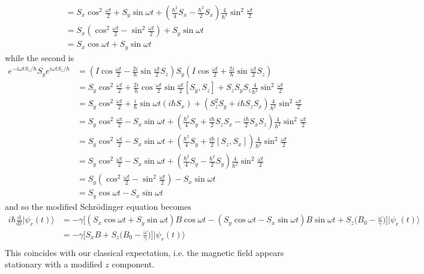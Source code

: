 \documentclass[../principles-of-quantum-mechanics.tex]{subfiles}
\begin{document}
\begin{questions}
\begin{solution}
\begin{align*}
				&= S_x\cos^2\tfrac{\omega t}{2} + S_y\sin\omega t + (\tfrac{\hbar^2}{4}S_x - \tfrac{\hbar^2}{2}S_x)\tfrac{4}{\hbar^2}\sin^2\tfrac{\omega t}{2} \\
				&= S_x(\cos^2\tfrac{\omega t}{2} - \sin^2\tfrac{\omega t}{2}) + S_y\sin\omega t \\
				&= S_x\cos\omega t + S_y\sin\omega t
			\end{align*}
			while the second is
			\begin{align*}
				e^{-i\omega tS_z/\hbar}S_ye^{i\omega tS_z/\hbar} &= (I\cos\tfrac{\omega t}{2} - \tfrac{2i}{\hbar}\sin\tfrac{\omega t}{2}S_z)S_y(I\cos\tfrac{\omega t}{2} + \tfrac{2i}{\hbar}\sin\tfrac{\omega t}{2}S_z) \\
				&= S_y\cos^2\tfrac{\omega t}{2} + \tfrac{2i}{\hbar}\cos\tfrac{\omega t}{2}\sin\tfrac{\omega t}{2}[S_y, S_z] +  S_zS_yS_z\tfrac{4}{\hbar^2}\sin^2\tfrac{\omega t}{2} \\
				&= S_y\cos^2\tfrac{\omega t}{2} + \frac{i}{\hbar}\sin\omega t(i\hbar S_x) + (S_z^2S_y + i\hbar S_zS_x)\tfrac{4}{\hbar^2}\sin^2\tfrac{\omega t}{2} \\
				&= S_y\cos^2\tfrac{\omega t}{2} - S_x\sin\omega t + (\tfrac{\hbar^2}{4}S_y + \tfrac{i\hbar}{2}S_zS_x - \tfrac{i\hbar}{2}S_xS_z)\tfrac{4}{\hbar^2}\sin^2\tfrac{\omega t}{2} \\
				&= S_y\cos^2\tfrac{\omega t}{2} - S_x\sin\omega t + (\tfrac{\hbar^2}{4}S_y + \tfrac{i\hbar}{2}[S_z, S_x])\tfrac{4}{\hbar^2}\sin^2\tfrac{\omega t}{2} \\
				&= S_y\cos^2\tfrac{\omega t}{2} - S_x\sin\omega t + (\tfrac{\hbar^2}{4}S_y - \tfrac{\hbar^2}{2}S_y)\tfrac{4}{\hbar^2}\sin^2\tfrac{\omega t}{2} \\
				&= S_y(\cos^2\tfrac{\omega t}{2} - \sin^2\tfrac{\omega t}{2}) - S_x\sin\omega t \\
				&= S_y\cos\omega t - S_x\sin\omega t
			\end{align*}
			and so the modified Schr\"odinger equation becomes
			\begin{align*}
				i\hbar\frac{\mathrm{d}}{\mathrm{d}t}|\psi_r(t)\rangle &= -\gamma \Big[(S_x\cos\omega t + S_y\sin\omega t)B\cos\omega t - (S_y\cos\omega t - S_x\sin\omega t)B\sin\omega t + S_z\Big(B_0 - \frac{\omega}{\gamma}\Big)\Big]|\psi_r(t)\rangle \\
				&= -\gamma \Big[S_xB + S_z\Big(B_0 - \frac{\omega}{\gamma}\Big)\Big]|\psi_r(t)\rangle \\
			\end{align*}
			This coincides with our classical expectation, i.e. the magnetic field appears stationary with a modified $z$ component.
			

\end{solution}
\end{questions}
\end{document}
